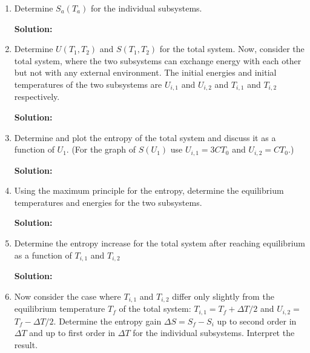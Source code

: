 \documentclass[10pt]{article}
\newenvironment{Solution}
    {\textbf{Solution:}
    
    \vspace{5mm}
    \begin{tcolorbox}
    }
    {
    \end{tcolorbox}
    \vspace{5mm}
    }
\begin{document}
\begin{enumerate}
\begin{enumerate}

\item Determine $S_{a}\left(T_{a}\right)$ for the individual subsystems.

\begin{Solution}


\end{Solution}

\item Determine $U\left(T_{1}, T_{2}\right)$ and $S\left(T_{1}, T_{2}\right)$ for the total system.
Now, consider the total system, where the two subsystems can exchange energy with each other but not with any external environment. The initial energies and initial temperatures of the two subsystems are $U_{i, 1}$ and $U_{i, 2}$ and $T_{i, 1}$ and $T_{i, 2}$ respectively.

\begin{Solution}


\end{Solution}

\item Determine and plot the entropy of the total system and discuss it as a function of $U_{1}$. (For the graph of $S\left(U_{1}\right)$ use $U_{i, 1}=3 C T_{0}$ and $U_{i, 2}=C T_{0}$.)

\begin{Solution}


\end{Solution}

\item Using the maximum principle for the entropy, determine the equilibrium temperatures and energies for the two subsystems.

\begin{Solution}


\end{Solution}

\item Determine the entropy increase for the total system after reaching equilibrium as a function of $T_{i, 1}$ and $T_{i, 2}$

\begin{Solution}


\end{Solution}

\item Now consider the case where $T_{i, 1}$ and $T_{i, 2}$ differ only slightly from the equilibrium temperature $T_{f}$ of the total system: $T_{i, 1}=T_{f}+\Delta T / 2$ and $U_{i, 2}=$ $T_{f}-\Delta T / 2 .$ Determine the entropy gain $\Delta S=S_{f}-S_{i}$ up to second order in $\Delta T$ and $\mathrm{up}$ to first order in $\Delta T$ for the individual subsystems. Interpret the result.


\end{enumerate}
\end{enumerate}
\end{document}

